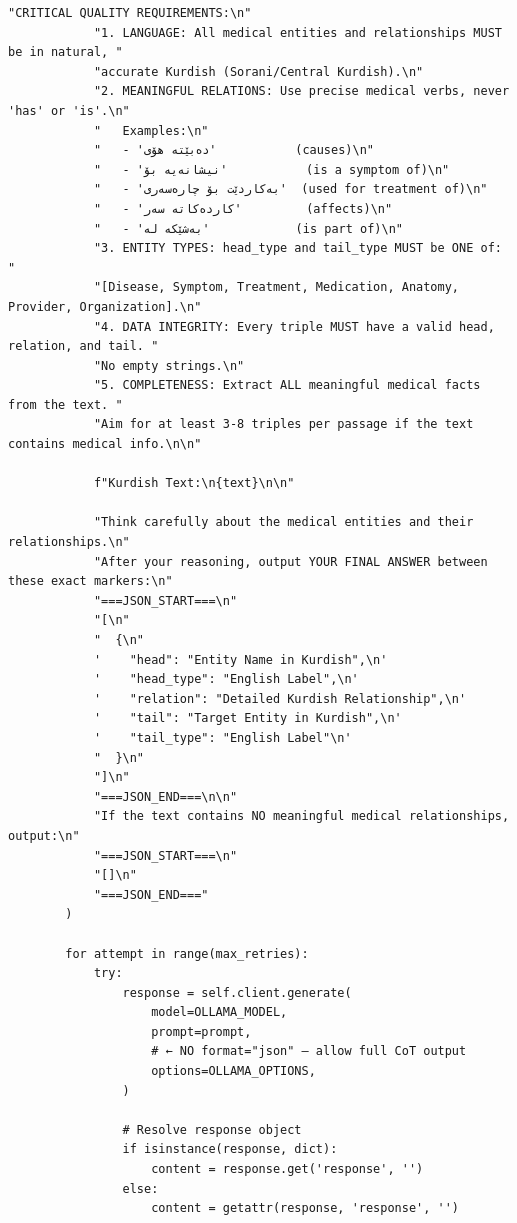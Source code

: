 \documentclass[11pt]{article}
\begin{document}
\begin{lstlisting}[style=pythoncode, caption={kg\_generator\_gpu\_1.py}]
            "CRITICAL QUALITY REQUIREMENTS:\n"
            "1. LANGUAGE: All medical entities and relationships MUST be in natural, "
            "accurate Kurdish (Sorani/Central Kurdish).\n"
            "2. MEANINGFUL RELATIONS: Use precise medical verbs, never 'has' or 'is'.\n"
            "   Examples:\n"
            "   - 'دەبێتە هۆی'           (causes)\n"
            "   - 'نیشانەیە بۆ'           (is a symptom of)\n"
            "   - 'بەکاردێت بۆ چارەسەری'  (used for treatment of)\n"
            "   - 'کاردەکاتە سەر'         (affects)\n"
            "   - 'بەشێکە لە'            (is part of)\n"
            "3. ENTITY TYPES: head_type and tail_type MUST be ONE of: "
            "[Disease, Symptom, Treatment, Medication, Anatomy, Provider, Organization].\n"
            "4. DATA INTEGRITY: Every triple MUST have a valid head, relation, and tail. "
            "No empty strings.\n"
            "5. COMPLETENESS: Extract ALL meaningful medical facts from the text. "
            "Aim for at least 3-8 triples per passage if the text contains medical info.\n\n"

            f"Kurdish Text:\n{text}\n\n"

            "Think carefully about the medical entities and their relationships.\n"
            "After your reasoning, output YOUR FINAL ANSWER between these exact markers:\n"
            "===JSON_START===\n"
            "[\n"
            "  {\n"
            '    "head": "Entity Name in Kurdish",\n'
            '    "head_type": "English Label",\n'
            '    "relation": "Detailed Kurdish Relationship",\n'
            '    "tail": "Target Entity in Kurdish",\n'
            '    "tail_type": "English Label"\n'
            "  }\n"
            "]\n"
            "===JSON_END===\n\n"
            "If the text contains NO meaningful medical relationships, output:\n"
            "===JSON_START===\n"
            "[]\n"
            "===JSON_END==="
        )

        for attempt in range(max_retries):
            try:
                response = self.client.generate(
                    model=OLLAMA_MODEL,
                    prompt=prompt,
                    # ← NO format="json" — allow full CoT output
                    options=OLLAMA_OPTIONS,
                )

                # Resolve response object
                if isinstance(response, dict):
                    content = response.get('response', '')
                else:
                    content = getattr(response, 'response', '')


\end{lstlisting}
\end{document}
